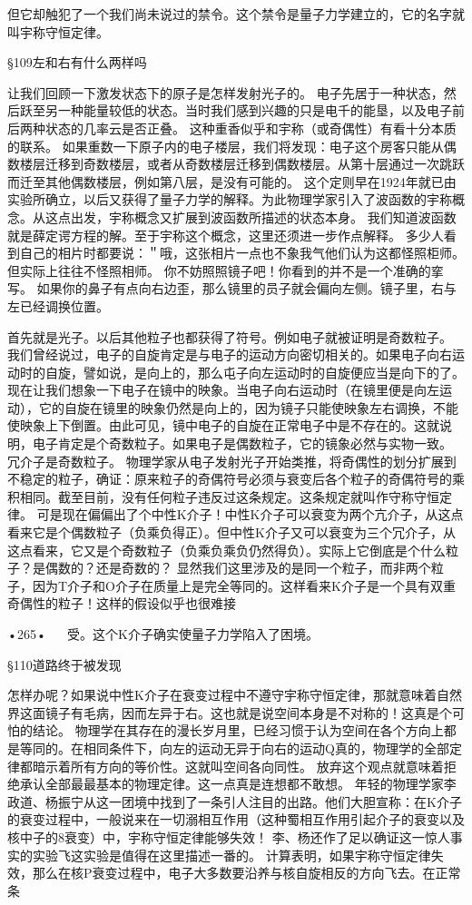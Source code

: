 但它却触犯了一个我们尚未说过的禁令。这个禁令是量子力学建立的，它的名字就叫宇称守恒定律。

§109左和右有什么两样吗

让我们回顾一下激发状态下的原子是怎样发射光子的。
电子先居于一种状态，然后跃至另一种能量较低的状态。当时我们感到兴趣的只是电千的能垦，以及电子前后两种状态的几率云是否正叠。
这种重香似乎和宇称（或奇偶性）有看十分本质的联系。
如果重数一下原子内的电子楼层，我们将发现：电子这个房客只能从偶数楼层迁移到奇数楼层，或者从奇数楼层迁移到偶数楼层。从第十层通过一次跳跃而迁至其他偶数楼层，例如第八层，是没有可能的。
这个定则早在1924年就已由实验所确立，以后又获得了量子力学的解释。为此物理学家引入了波函数的宇称概念。从这点出发，宇称概念又扩展到波函数所描述的状态本身。
我们知道波函数就是薛定谔方程的解。至于宇称这个概念，这里还须进一步作点解释。
多少人看到自己的相片时都要说：＂哦，这张相片一点也不象我气他们认为这都怪照柜师。但实际上往往不怪照相师。
你不妨照照镜子吧！你看到的并不是一个准确的挛写。
如果你的鼻子有点向右边歪，那么镜里的员子就会偏向左侧。镜子里，右与左已经调换位置。
 
首先就是光子。以后其他粒子也都获得了符号。例如电子就被证明是奇数粒子。
我们曾经说过，电子的自旋肯定是与电子的运动方向密切相关的。如果电子向右运动时的自旋，譬如说，是向上的，那么屯子向左运动时的自旋便应当是向下的了。现在让我们想象一下电子在镜中的映象。当电子向右运动时（在镜里便是向左运动），它的自旋在镜里的映象仍然是向上的，因为镜子只能使映象左右调换，不能使映象上下倒置。由此可见，镜中电子的自旋在正常电子中是不存在的。这就说明，电子肯定是个奇数粒子。如果电子是偶数粒子，它的镜象必然与实物一致。
冗介子是奇数粒子。
物理学家从电子发射光子开始类推，将奇偶性的划分扩展到不稳定的粒子，确证：原来粒子的奇偶符号必须与衰变后各个粒子的奇偶符号的乘积相同。截至目前，没有任何粒子违反过这条规定。这条规定就叫作守称守恒定律。
可是现在偏偏出了个中性K介子！中性K介子可以衰变为两个亢介子，从这点看来它是个偶数粒子（负乘负得正）。但中性K介子又可以衰变为三个冗介子，从这点看来，它又是个奇数粒子（负乘负乘负仍然得负）。实际上它倒底是个什么粒子？是偶数的？还是奇数的？
显然我们这里涉及的是同一个粒子，而非两个粒子，因为T介子和O介子在质量上是完全等同的。这样看来K介子是一个具有双重奇偶性的粒子！这样的假设似乎也很难接

•265•
  
受。这个K介子确实使量子力学陷入了困境。

§110道路终于被发现

怎样办呢？如果说中性K介子在衰变过程中不遵守宇称守恒定律，那就意味着自然界这面镜子有毛病，因而左异于右。这也就是说空间本身是不对称的！这真是个可怕的结论。
物理学在其存在的漫长岁月里，巳经习惯于认为空间在各个方向上都是等同的。在相同条件下，向左的运动无异于向右的运动Q真的，物理学的全部定律都暗示着所有方向的等价性。这就叫空间各向同性。
放弃这个观点就意味着拒绝承认全部最最基本的物理定律。这一点真是连想都不敢想。
年轻的物理学家李政道、杨振宁从这一团境中找到了一条引人注目的出路。他们大胆宣称：在K介子的衰变过程中，一般说来在一切溺相互作用（这种蜀相互作用引起介子的衰变以及核中子的8衰变）中，宇称守恒定律能够失效！
李、杨还作了足以确证这一惊人事实的实验飞这实验是值得在这里描述一番的。
计算表明，如果宇称守恒定律失效，那么在核P衰变过程中，电子大多数要沿养与核自旋相反的方向飞去。在正常条

